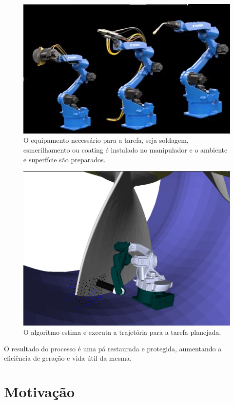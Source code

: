 \begin{figure}[H]
\centering
\includegraphics[width=0.9\columnwidth]{figs/robots_evo}
\caption{O equipamento necessário para a tarefa, seja soldagem, esmerilhamento
ou coating é instalado no manipulador e o ambiente e superfície são preparados.}
\end{figure}

\begin{figure}[H]
\centering
\includegraphics[width=0.9\columnwidth]{figs/footleft}
\caption{O algoritmo estima e executa a trajetória para a tarefa planejada.}
\end{figure}

O resultado do processo é uma pá restaurada e protegida, aumentando a eficiência
de geração e vida útil da mesma. 

\section{Motivação}


